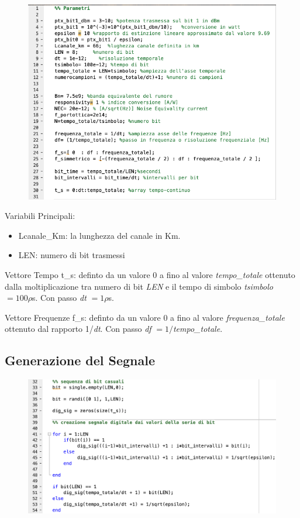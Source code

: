 \documentclass[12pt, a4paper]{article}
\begin{document}
\begin{figure}[h!]
\centering
\includegraphics[scale=1.0]{parametri.png}
\caption{}
\label{}
\end{figure}

Variabili Principali:
\begin{itemize}
	\item Lcanale\_Km: la lunghezza del canale in Km. 
	\item LEN: numero di bit trasmessi
\end{itemize}

Vettore Tempo t\_s: definto da un valore 0 a fino al valore \textit{tempo\_totale} ottenuto dalla moltiplicazione tra numero di bit \textit{LEN} e il tempo di simbolo \textit{tsimbolo} $= 100 \rho$s. Con passo \textit{dt} $= 1 \rho$s.

\vspace{5mm}
Vettore Frequenze f\_s: definto da un valore 0 a fino al valore \textit{frequenza\_totale} ottenuto dal rapporto 1/\textit{dt}.  Con passo \textit{df} $= 1/$\textit{tempo\_totale}.


\newpage
\subsection{Generazione del Segnale}
\label{sub:2.2}

\begin{figure}[h!]
\centering
\includegraphics[scale=0.5]{sequenzabin.png}
\caption{}
\label{}
\end{figure}
\end{document}
